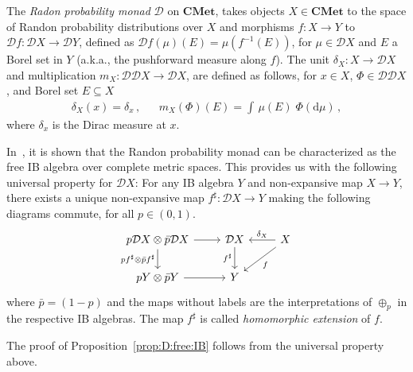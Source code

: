 \documentclass[a4paper,UKenglish,cleveref, autoref, thm-restate]{lipics-v2021}
\newcommand{\cat}[1]{\mathbf{#1}}
\newcommand{\CMet}{\cat{CMet}}
\newcommand{\mprod}{\otimes}
\newcommand{\D}{\mathcal{D}}
\newcommand{\TD}{\mathcal{D}}
\begin{document}
The \emph{Radon probability monad} $\TD$ on $\CMet$, 
takes objects $X \in \CMet$ to the space of Randon probability distributions over $X$ and morphisms $f\colon X \to Y$ to $\D f \colon \D X \to \D Y$, defined as $
\D f (\mu)(E) = \mu (f^{-1}(E))$, for $\mu\in\D X$ and $E$ a Borel set in $Y$ (a.k.a., the pushforward measure along $f$). The unit $\delta_X \colon X \to \D X$ and multiplication $m_X \colon \D\D X \to \D X$, are defined as follows, for $x \in X$, $\Phi \in \D \D X $, 
and Borel set $E \subseteq X$
\begin{align*}
\delta_X(x) = \delta_x \,,
&&
m_X(\Phi)(E) = \int \, \mu(E) \; {\Phi(\mathrm{d}\mu)} \,,
\end{align*}
where $\delta_x$ is the Dirac measure at $x$.

In~\cite[Theorem~3.8]{MardarePP18}, it is shown that the Randon probability monad can be characterized as the free IB algebra over complete metric spaces. This provides us with the following universal property for $\D X$: For any IB algebra $Y$ and non-expansive map $X \to Y$, there exists a unique non-expansive map $f^\sharp \colon \D X \to Y$ making the following diagrams commute, for all $p \in (0,1)$.
\[
 \begin{tikzcd}
  p\D X \mprod \bar{p} \D X \ar{r} \arrow[d, "pf^\sharp \mprod \bar{p} f^\sharp"'] 
  & \D X \arrow[d, "f^\sharp"'] & X \arrow[l,"\delta_X"'] \arrow[dl, "f"]\\
  pY \mprod \bar{p}Y \ar{r} & Y
 \end{tikzcd}
\]
where $\bar p = (1-p)$ and the maps without labels are the interpretations of $\oplus_p$ in the respective IB algebras. The map $f^\sharp$ is called \emph{homomorphic extension} of $f$.

The proof of Proposition~\ref{prop:D:free:IB} follows from the universal
property above.
\end{document}
